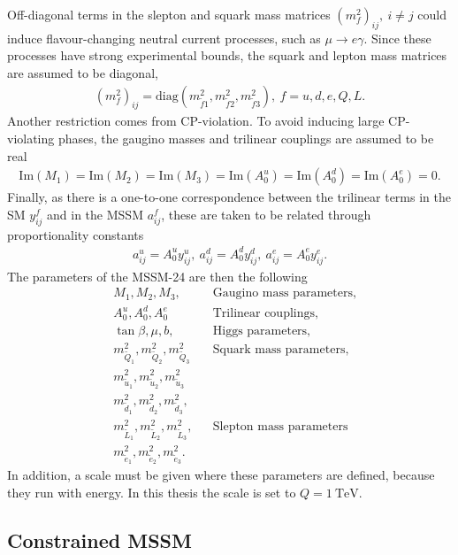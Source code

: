 \documentclass[twoside,english]{uiofysmaster}
\begin{document}
{Off-diagonal terms in the slepton and squark mass matrices $(m_f^2)_{ij},~i\neq j$ could induce flavour-changing neutral current processes, such as $\mu \rightarrow e \gamma$. Since these processes have strong experimental bounds, the squark and lepton mass matrices are assumed to be diagonal,
\begin{align}
(m_f^2)_{ij} = \text{diag}(m_{\widetilde{f}1}^2, m_{\widetilde{f}2}^2, m_{\widetilde{f}3}^2), ~f = u, d, e, Q, L.
\end{align}
Another restriction comes from CP-violation. To avoid inducing large CP-violating phases, the gaugino masses and trilinear couplings are assumed to be real
\begin{align}
\text{Im}(M_1) = \text{Im}(M_2) = \text{Im} (M_3) = \text{Im} (A_0^u) = \text{Im} (A_0^d) = \text{Im} (A_0^e) = 0.
\end{align}
Finally, as there is a one-to-one correspondence between the trilinear terms in the SM $y_{ij}^f$ and in the MSSM $a^f_{ij}$, these are taken to be related through proportionality constants
\begin{align}
a^u_{ij} = A_0^uy_{ij}^u, ~a^d_{ij} = A_0^dy_{ij}^d, ~a^e_{ij} = A_0^ey_{ij}^e.
\end{align}
 The parameters of the MSSM-24 are then the following
\begin{align}
&M_1, M_2, M_3, && \text{Gaugino mass parameters,} \nonumber \\
&A_0^u, A_0^d, A_0^e && \text{Trilinear couplings,} \nonumber\\
&\tan \beta, \mu, b, && \text{Higgs parameters,} \nonumber\\
& m_{\widetilde{Q}_1}^2, m_{\widetilde{Q}_2}^2, m_{\widetilde{Q}_3}^2 && \text{Squark mass parameters,}\nonumber\\
& m_{\widetilde{u}_1}^2, m_{\widetilde{u}_2}^2, m_{\widetilde{u}_3}^2\nonumber\\
&m_{\widetilde{d}_1}^2, m_{\widetilde{d}_2}^2, m_{\widetilde{d}_3}^2,\nonumber\\
& m_{\widetilde{L}_1}^2, m_{\widetilde{L}_2}^2, m_{\widetilde{L}_3}^2, &&\text{Slepton mass parameters}\nonumber\\
& m_{\widetilde{e}_1}^2, m_{\widetilde{e}_2}^2, m_{\widetilde{e}_3}^2.\nonumber
\end{align}
In addition, a scale must be given where these parameters are defined, because they run with energy. In this thesis the scale is set to $Q=1~\mathrm{TeV}$.

\subsection{Constrained MSSM}\label{Sec:: physics back : CMSSM}

}
\end{document}
